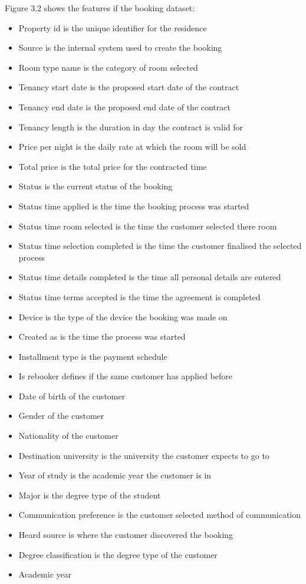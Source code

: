 Figure 3.2 shows the features if the booking dataset:

\begin{itemize}
    \item Property id is the unique identifier for the residence 
    \item Source is the internal system used to create the booking
    \item Room type name is the category of room selected
    \item Tenancy start date is the proposed start date of the contract
    \item Tenancy end date is the proposed end date of the contract
    \item Tenancy length is the duration in day the contract is valid for
    \item Price per night is the daily rate at which the room will be sold
    \item Total price is the total price for the contracted time
    \item Status is the current status of the booking
    \item Status time applied is the time the booking process was started
    \item Status time room selected is the time the customer selected there room
    \item Status time selection completed is the time the customer finalised the selected process 
    \item Status time details completed is the time all personal details are entered
    \item Status time terms accepted is the time the agreement is completed
    \item Device is the type of the device the booking was made on
    \item Created as is the time the process was started
    \item Installment type is the payment schedule
    \item Is rebooker defines if the same customer has applied before
    \item Date of birth of the customer
    \item Gender of the customer
    \item Nationality of the customer
    \item Destination university is the university the customer expects to go to
    \item Year of study is the academic year  the customer is in
    \item Major is the degree type of the student
    \item Communication preference is the customer selected method of communication
    \item Heard source is where the customer discovered the booking
    \item Degree classification is the degree type of the customer
    \item Academic year
\end{itemize}

